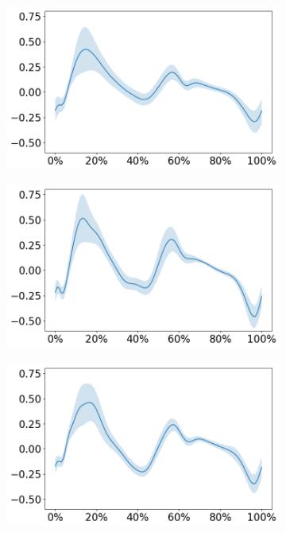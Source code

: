 \documentclass[../main.tex]{subfiles}
\begin{document}
\begin{figure}
     \centering
     \begin{subfigure}[b]{0.325\textwidth}
         \centering
         \includegraphics[width=\textwidth]{img/results/moment_avg/subject01_all_set1_moment_avg.png}
     \end{subfigure}
     \hfill
     \begin{subfigure}[b]{0.325\textwidth}
         \centering
         \includegraphics[width=\textwidth]{img/results/moment_avg/subject02_all_set1_moment_avg.png}
     \end{subfigure}
     \hfill
     \begin{subfigure}[b]{0.325\textwidth}
         \centering
         \includegraphics[width=\textwidth]{img/results/moment_avg/subject06_all_set1_moment_avg.png}

\end{subfigure}
\end{figure}
\end{document}
